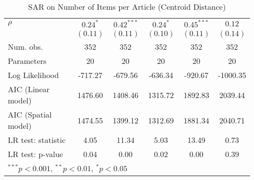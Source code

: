 \begin{table}[!h]
\begin{center}
\begin{tabular}{l c c c c c }
$\rho$                  & $0.24^{*}$   & $0.42^{***}$  & $0.24^{*}$   & $0.45^{***}$ & $0.12$       \\
                        & $(0.11)$     & $(0.11)$      & $(0.10)$     & $(0.11)$     & $(0.14)$     \\
\midrule
Num. obs.               & 352          & 352           & 352          & 352          & 352          \\
Parameters              & 20           & 20            & 20           & 20           & 20           \\
Log Likelihood          & -717.27      & -679.56       & -636.34      & -920.67      & -1000.35     \\
AIC (Linear model)      & 1476.60      & 1408.46       & 1315.72      & 1892.83      & 2039.44      \\
AIC (Spatial model)     & 1474.55      & 1399.12       & 1312.69      & 1881.34      & 2040.71      \\
LR test: statistic      & 4.05         & 11.34         & 5.03         & 13.49        & 0.73         \\
LR test: p-value        & 0.04         & 0.00          & 0.02         & 0.00         & 0.39         \\
\bottomrule
\multicolumn{6}{l}{\scriptsize{$^{***}p<0.001$, $^{**}p<0.01$, $^*p<0.05$}}
\end{tabular}
\caption{SAR on Number of Items per Article (Centroid Distance)}
\label{table:coefficients}
\end{center}
\end{table}
